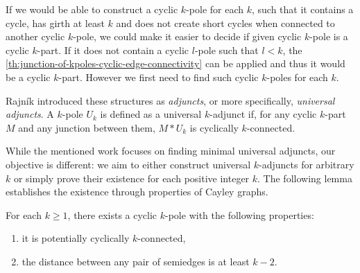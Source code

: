 \documentclass[12pt, twoside]{book}
\begin{document}
If we would be able to construct a cyclic $k$-pole for each $k$, such that it contains a cycle, has girth at least $k$ and does not create short cycles when connected to another cyclic $k$-pole, we could make it easier to decide if given cyclic $k$-pole is a cyclic $k$-part. If it does not contain a cyclic $l$-pole such that $l<k$, the \cref{th:junction-of-kpoles-cyclic-edge-connectivity} can be applied and thus it would be a cyclic $k$-part. However we first need to find such cyclic $k$-poles for each $k$.

Rajník \cite{Rajnik_phd} introduced these structures as \textit{adjuncts}, or more specifically, \textit{universal adjuncts}. A $k$-pole $U_k$ is defined as a universal $k$-adjunct if, for any cyclic $k$-part $M$ and any junction between them, $M*U_k$ is cyclically $k$-connected.

While the mentioned work focuses on finding minimal universal adjuncts, our objective is different: we aim to either construct universal $k$-adjuncts for arbitrary $k$ or simply prove their existence for each positive integer $k$. The following lemma establishes the existence through properties of Cayley graphs.

\begin{lemma}\label{lem:cyclic-k-pole-no-short-cycles-exists}
	For each $k\geq 1$, there exists a cyclic $k$-pole with the following properties:
	\begin{enumerate}[label=(\roman*)]
		\item it is potentially cyclically $k$-connected,
		\item the distance between any pair of semiedges is at least $k-2$.
	\end{enumerate}
\end{lemma}
\end{document}
